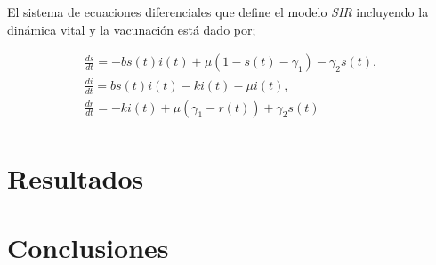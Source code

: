 \documentclass[journal]{IEEEtran}
\begin{document}
El sistema de ecuaciones diferenciales que define el modelo \textit{SIR} incluyendo la dinámica vital y
la vacunación \cite{SIRS-VAC} está dado por;

\begin{equation}\label{SIRS-VAC}
  \begin{split}
    \frac{ds}{dt} = -bs(t)i(t) + \mu (1 - s(t) -\gamma_1) - \gamma_2 s(t),\\
    \frac{di}{dt} = bs(t)i(t)-ki(t)-\mu i(t),\\
    \frac{dr}{dt} = -ki(t) + \mu (\gamma_1 - r(t)) + \gamma_2 s(t) \\
  \end{split}
\end{equation}

\section{Resultados}







\section{Conclusiones}



\ifCLASSOPTIONcaptionsoff
	\newpage
\fi
\end{document}
